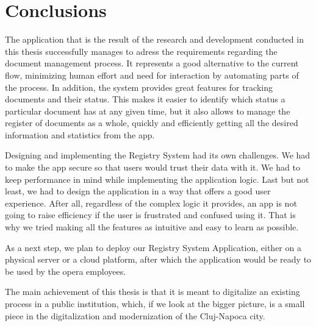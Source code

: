 \chapter{Conclusions}
\label{chapter:conclusions}

The application that is the result of the research and development conducted in this thesis successfully manages to adress the requirements regarding the document management process. It represents a good alternative to the current flow, minimizing human effort and need for interaction by automating parts of the process. In addition, the system provides great features for tracking documents and their status. This makes it easier to identify which status a particular document has at any given time, but it also allows to manage the register of documents as a whole, quickly and efficiently getting all the desired information and statistics from the app.

Designing and implementing the Registry System had its own challenges. We had to make the app secure so that users would trust their data with it. We had to keep performance in mind while implementing the application logic. Last but not least, we had to design the application in a way that offers a good user experience. After all, regardless of the complex logic it provides, an app is not going to raise efficiency if the user is frustrated and confused using it. That is why we tried making all the features as intuitive and easy to learn as possible.

As a next step, we plan to deploy our Registry System Application, either on a physical server or a cloud platform, after which the application would be ready to be used by the opera employees.

The main achievement of this thesis is that it is meant to digitalize an existing process in a public institution, which, if we look at the bigger picture, is a small piece in the digitalization and modernization of the Cluj-Napoca city.
